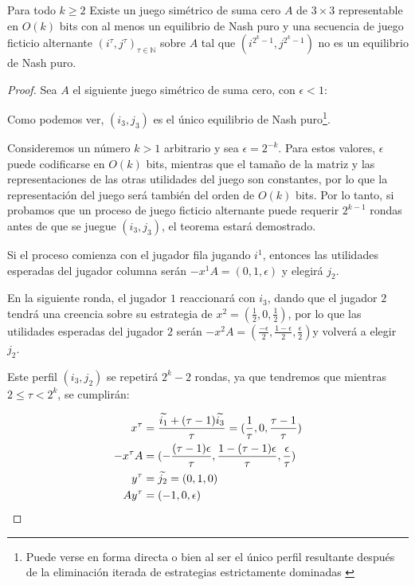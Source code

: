\begin{theorem} \label{teorema:afp:velocidad:simetricos}
    Para todo $k \geq 2$ Existe un juego simétrico de suma cero $A$ de $3 \times 3$ representable en $O(k)$ bits con al menos un equilibrio de Nash puro y una secuencia de juego ficticio alternante $(i^\tau, j^\tau)_{\tau \in \mathbb{N}}$ sobre $A$ tal que $(i^{2^k-1}, j^{2^k-1})$ no es un equilibrio de Nash puro.
\end{theorem}
\begin{proof}
    Sea $A$ el siguiente juego simétrico de suma cero, con $\epsilon < 1$:

    

    Como podemos ver, $(i_3, j_3)$ es el único equilibrio de Nash puro\footnote{Puede verse en forma directa o bien al ser el único perfil resultante después de la eliminación iterada de estrategias estrictamente dominadas \cite{libro:rubinstein}}.

    Consideremos un número $k > 1$ arbitrario y sea $\epsilon = 2^{-k}$. Para estos valores, $\epsilon$ puede codificarse en $O(k)$ bits, mientras que el tamaño de la matriz y las representaciones de las otras utilidades del juego son constantes, por lo que la representación del juego será también del orden de  $O(k)$ bits. Por lo tanto, si probamos que un proceso de juego ficticio alternante puede requerir $2^{k-1}$ rondas antes de que se juegue $(i_3, j_3)$, el teorema estará demostrado.

    Si el proceso comienza con el jugador fila jugando $i^1$, entonces las utilidades esperadas del jugador columna serán $-x^1A = (0, 1, \epsilon)$ y elegirá $j_2$.

    En la siguiente ronda, el jugador $1$ reaccionará con $i_3$, dando que el jugador $2$ tendrá una creencia sobre su estrategia de $x^2 = (\frac{1}{2},0,\frac{1}{2})$, por lo que las utilidades esperadas del jugador $2$ serán $-x^2A = (\frac{-\epsilon}{2}, \frac{1-\epsilon}{2}, \frac{\epsilon}{2})$y volverá a elegir $j_2$.

    Este perfil $(i_3, j_2)$ se repetirá $2^k - 2$ rondas, ya que tendremos que mientras $2 \le \tau < 2^k$, se cumplirán:

    \begin{align*}
        x^\tau     &= \frac{\widetilde{i_1} + (\tau - 1) \widetilde{i_3}}{\tau} = (\frac{1}{\tau}, 0,\frac{\tau - 1}{\tau}) \\
        -x^{\tau}A &= (-\frac{(\tau-1) \epsilon}{\tau}, \frac{1-(\tau-1)\epsilon}{\tau}, \frac{\epsilon}{\tau}) \\
        y^\tau     &= \widetilde{j_2} = (0, 1, 0) \\
        Ay^\tau    &= (- 1, 0, \epsilon) \\
    \end{align*}


\end{proof}

